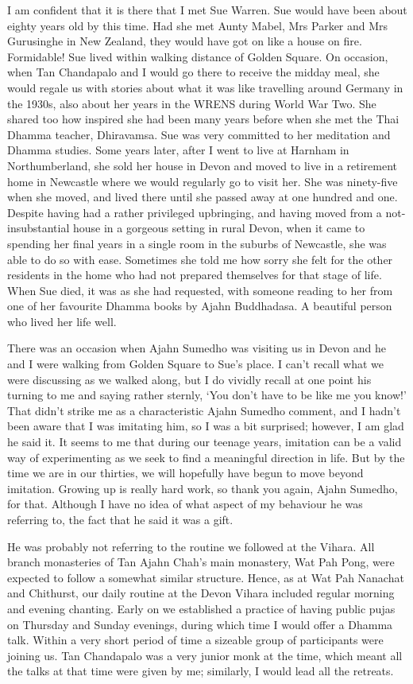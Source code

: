 I am confident that it is there that I met Sue Warren. Sue would have
been about eighty years old by this time. Had she met Aunty Mabel, Mrs
Parker and Mrs Gurusinghe in New Zealand, they would have got on like a
house on fire. Formidable! Sue lived within walking distance of Golden
Square. On occasion, when Tan Chandapalo and I would go there to receive
the midday meal, she would regale us with stories about what it was like
travelling around Germany in the 1930s, also about her years in the WRENS\cite{wrens}
during World War Two. She shared too how inspired she had been
many years before when she met the Thai Dhamma teacher, Dhiravamsa. Sue
was very committed to her meditation and Dhamma studies. Some years
later, after I went to live at Harnham in Northumberland, she sold her
house in Devon and moved to live in a retirement home in Newcastle where
we would regularly go to visit her. She was ninety-five when she moved,
and lived there until she passed away at one hundred and one. Despite
having had a rather privileged upbringing, and having moved from a
not-insubstantial house in a gorgeous setting in rural Devon, when it
came to spending her final years in a single room in the suburbs of
Newcastle, she was able to do so with ease. Sometimes she told me how
sorry she felt for the other residents in the home who had not prepared
themselves for that stage of life. When Sue died, it was as she had
requested, with someone reading to her from one of her favourite Dhamma
books by Ajahn Buddhadasa. A beautiful person who lived her life well.

There was an occasion when Ajahn Sumedho was visiting us in Devon and he
and I were walking from Golden Square to Sue's place. I can't recall
what we were discussing as we walked along, but I do vividly recall at
one point his turning to me and saying rather sternly, `You don't have
to be like me you know!' That didn't strike me as a
characteristic Ajahn Sumedho comment, and I hadn't been aware that I was
imitating him, so I was a bit surprised; however, I am glad he said it.
It seems to me that during our teenage years, imitation can be a valid
way of experimenting as we seek to find a meaningful direction in life.
But by the time we are in our thirties, we will hopefully have begun to
move beyond imitation. Growing up is really hard work, so thank you
again, Ajahn Sumedho, for that. Although I have no idea of what aspect
of my behaviour he was referring to, the fact that he said it was a
gift.

He was probably not referring to the routine we followed at the Vihara.
All branch monasteries of Tan Ajahn Chah's main monastery, Wat Pah Pong,
were expected to follow a somewhat similar structure. Hence, as at Wat
Pah Nanachat and Chithurst, our daily routine at the Devon Vihara
included regular morning and evening chanting. Early on we established a
practice of having public pujas on Thursday and Sunday evenings, during
which time I would offer a Dhamma talk. Within a very short period of
time a sizeable group of participants were joining us. Tan Chandapalo
was a very junior monk at the time, which meant all the talks at that time were given
by me; similarly, I would lead all the retreats.

